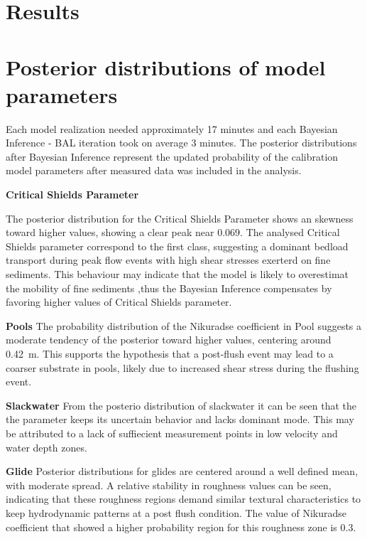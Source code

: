 \documentclass[draft,linenumbers,onecolumn]{agujournal2019} %
\begin{document}
\section{Results}
\label{Results}

\section*{Posterior distributions of model parameters}

Each model realization needed approximately 17 minutes and each Bayesian Inference - BAL iteration took on average 3 minutes. The posterior distributions after Bayesian Inference represent the updated probability of the calibration model parameters after measured data was included in the analysis.

\textbf{Critical Shields Parameter}

The posterior distribution for the Critical Shields Parameter shows an skewness toward higher values, showing a clear peak near 0.069. The analysed Critical Shields parameter correspond to the first class, suggesting a dominant bedload transport during peak flow events with high shear stresses  exerterd on fine sediments. This behaviour may indicate that the model is  likely to overestimat the mobility of fine sediments ,thus the Bayesian Inference compensates by favoring higher values of Critical Shields parameter. 

\textbf{Pools}
The probability distribution of the Nikuradse coefficient in Pool suggests a moderate tendency of the posterior toward higher values, centering around 0.42~m. This supports the hypothesis that a post-flush event may lead to a coarser substrate in pools, likely due to increased shear stress during the flushing event.

\textbf{Slackwater}
From the posterio distribution of slackwater it can be seen that the the parameter keeps its uncertain behavior and lacks dominant mode. This may be attributed to a lack of suffiecient measurement points in low velocity and water depth zones.

\textbf{Glide}
Posterior distributions for glides are centered around a well defined mean, with moderate spread. A relative stability in roughness values can be seen, indicating that these roughness regions demand similar textural characteristics to keep hydrodynamic patterns at a post flush condition. The value of Nikuradse coefficient that showed a higher probability region for this roughness zone is 0.3.
\end{document}
